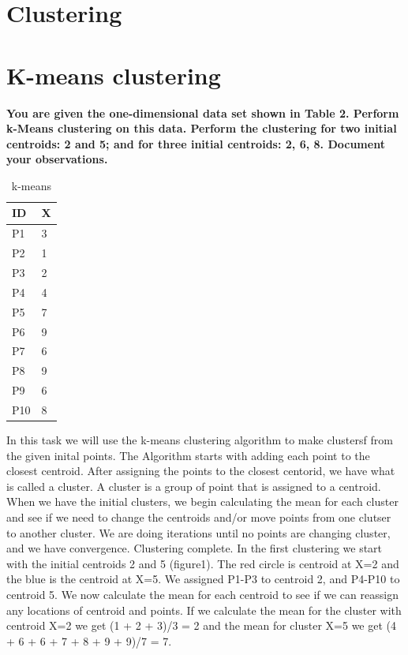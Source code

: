 \section{Clustering}

	\section*{K-means clustering}

	{\bf You are given the one-dimensional data set shown in Table 2. Perform k-Means
	clustering on this data. Perform the clustering for two initial centroids: 2 and
	5; and for three initial centroids: 2, 6, 8. Document your observations.}

	\noindent\makebox[\linewidth]{\rule{\textwidth}{1pt}} 

	\begin{table}
		\begin{tabular}{| p{1cm} | p{1cm} |}
			\hline
			{\bf ID} & {\bf X} \\ \hline
			P1 & 3 \\
			P2 & 1 \\
			P3 & 2 \\
			P4 & 4 \\
			P5 & 7 \\
			P6 & 9 \\
			P7 & 6 \\
			P8 & 9 \\
			P9 & 6 \\
			P10 & 8 \\ \hline
		\end{tabular}
		\caption{k-means}
	\end{table}
	In this task we will use the k-means clustering algorithm to make 
	clustersf from the given inital points.
	The Algorithm starts with adding each point to the closest centroid. 
	After assigning the points
	to the closest centorid, we have what is called a cluster. A cluster is a 
	group of point that is assigned to a centroid. 
	When we have the initial clusters, we begin calculating the mean for each 
	cluster and see if we need to change the centroids and/or move points from
	one clutser to another cluster. 
	We are doing iterations until no points are changing cluster, and we have
	convergence. Clustering complete.
	In the first clustering we start with the initial centroids 2 and 5 (figure1).
	The red circle is centroid at X=2 and the blue is the centroid at X=5.
	We assigned P1-P3 to centroid 2, and P4-P10 to centroid 5.
	We now calculate the mean for each centroid to see if we can reassign any
	locations of centroid and points. If we calculate the mean for the cluster 
	with centroid X=2 we get (1 + 2 + 3)/3 = 2 and the mean for cluster X=5 we
	get (4 + 6 + 6 + 7 + 8 + 9 + 9)/7 = 7. 

